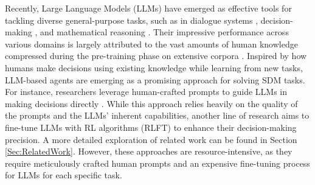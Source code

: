 \documentclass{article} %
\theoremstyle{plain}
\theoremstyle{definition}
\theoremstyle{remark}
\begin{document}
{
    Recently, Large Language Models (LLMs) have emerged as effective tools for tackling diverse general-purpose tasks, such as in dialogue systems \citep{brooks2023large}, decision-making \citep{zhao2024expel}, and mathematical reasoning \citep{imani2023mathprompter}. Their impressive performance across various domains is largely attributed to the vast amounts of human knowledge compressed during the pre-training phase on extensive corpora \citep{tucker2023increasing}. %
    Inspired by how humans make decisions using existing knowledge while learning from new tasks, LLM-based agents are emerging as a promising approach for solving SDM tasks. For instance, researchers leverage human-crafted prompts to guide LLMs in making decisions directly \citep{zhang2023proagent, wang2023voyager, ma2023large}. While this approach relies heavily on the quality of the prompts and the LLMs' inherent capabilities, another line of research aims to fine-tune LLMs with RL algorithms (RLFT) \citep{carta2023grounding, christianos2023panguagent,tantrue,zhou2024reflect} to enhance their decision-making precision. A more detailed exploration of related work can be found in Section \ref{Sec:RelatedWork}. However, these approaches are resource-intensive, as they require meticulously crafted human prompts and an expensive fine-tuning process for LLMs for each specific task.



}
\end{document}
